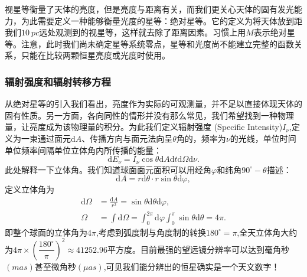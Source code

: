 \documentclass[../天体物理基础.tex]{subfiles}
\begin{document}
视星等衡量了天体的亮度，但是亮度与距离有关，而我们更关心天体的固有发光能力，为此需要定义一种能够衡量光度的星等：绝对星等。它的定义为将天体放到距我们$\qty{10}{pc}$远处观测到的视星等，这样就去除了距离因素。习惯上用$M$表示绝对星等。注意，此时我们尚未确定星等系统零点，星等和光度尚不能建立完整的函数关系，只能在比较两颗恒星亮度或光度时使用。

\subsubsection{辐射强度和辐射转移方程}
从绝对星等的引入我们看出，亮度作为实际的可观测量，并不足以直接体现天体的固有性质。另一方面，各向同性的情形并没有那么常见，我们希望找到一种物理量，让亮度成为该物理量的积分。为此我们定义辐射强度 (Specific Intensity)$I_{\nu}$,定义为一束通过面元$\mathrm{d}A$、传播方向与面元法向呈$\theta$角的，频率为$\nu$的光线，单位时间单位频率间隔单位立体角内所传播的能量：
\begin{equation}
\mathrm{d}E_{\nu}=I_{\nu}\cos\theta\mathrm{d}A\mathrm{d}t\mathrm{d}\Omega\mathrm{d}\nu.
\end{equation}
此处解释一下立体角。我们知道球面面元面积可以用经角$\varphi$和纬角$90^{\circ}-\theta$描述：
\begin{equation}
\mathrm{d}A=r\mathrm{d}\theta\cdot r\sin\theta\mathrm{d}\varphi,
\end{equation}
定义立体角为
\begin{align}
\mathrm{d}\Omega&=\frac{\mathrm{d}A}{r^{2}}=\sin\theta\mathrm{d}\theta\mathrm{d}\varphi,\\
\Omega&=\int\mathrm{d}\Omega=\int_{0}^{2\pi}\mathrm{d}\varphi\int_{0}^{\pi}\sin\theta\mathrm{d}\theta=4\pi.
\end{align}
即整个球面的立体角为$4\pi$,考虑到弧度制与角度制的转换$180^{\circ}=\pi$,全天立体角大约为$4\pi\times\left(\dfrac{180^{\circ}}{\pi}\right)^{2}\approx41252.96$平方度。目前最强的望远镜分辨率可以达到毫角秒$(\unit{mas})$甚至微角秒$(\unit{\mu as})$,可见我们能分辨出的恒星确实是一个天文数字！
\end{document}
